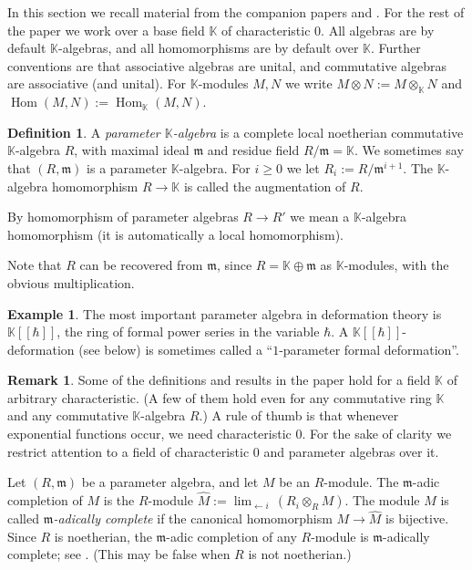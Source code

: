 \documentclass[a4paper, 10pt]{amsart}
\theoremstyle{definition}
\newtheorem{dfn}[equation]{Definition}
\newtheorem{rem}[equation]{Remark}
\newtheorem{exa}[equation]{Example}
\numberwithin{equation}{section}
\newcommand{\opn}{\operatorname}
\newcommand{\mfrak}[1]{\mathfrak{#1}}
\newcommand{\mbb}[1]{\mathbb{#1}}
\newcommand{\ot}{\otimes}
\newcommand{\what}[1]{\widehat{#1}}
\newcommand{\K}{\mbb{K}}
\newcommand{\m}{\mfrak{m}}
\begin{document}
In this section we recall material from the companion papers
\cite{Ye7} and \cite{Ye9}.
For the rest of the paper we work over a base field $\K$ of characteristic
$0$. All algebras are by default $\K$-algebras, and all homomorphisms are by
default over $\K$. Further conventions are that associative algebras are
unital, and commutative algebras are associative (and unital). 
For $\K$-modules $M, N$ we write $M \ot N := M \ot_{\K} N$  and
$\opn{Hom}(M, N) := \opn{Hom}_{\K}(M, N)$.

\begin{dfn} \label{dfn:13}
A {\em parameter $\K$-algebra} is a 
complete local noetherian commutative
$\K$-algebra $R$, with maximal ideal $\m$ and residue field 
$R / \m = \K$.
We sometimes say that $(R, \m)$ is a parameter $\K$-algebra.
For $i \geq 0$ we let
$R_i := R / \m^{i+1}$.
The $\K$-algebra homomorphism $R \to \K$ is called the 
augmentation of $R$.

By homomorphism of parameter algebras $R \to R'$ we mean a $\K$-algebra
homomorphism (it is automatically a local homomorphism).
\end{dfn}

Note that $R$ can be recovered from $\m$, since
$R = \K \oplus \m$ as $\K$-modules, with the obvious multiplication. 

\begin{exa}
The most important parameter algebra in deformation theory is
$\K[[\hbar]]$, the ring of formal power series in the variable
$\hbar$. A $\K[[\hbar]]$-deformation (see below) is sometimes called
a ``$1$-parameter formal deformation''. 
\end{exa}

\begin{rem}
Some of the definitions and results in the paper hold for a field $\K$ of
arbitrary characteristic.
(A few of them hold even for any commutative ring $\K$ and any 
commutative $\K$-algebra $R$.) A rule of thumb is that
whenever exponential functions occur, we need characteristic $0$. For the sake
of clarity we restrict attention to a field of characteristic $0$ and parameter
algebras over it.
\end{rem}

Let $(R, \m)$ be a parameter algebra, and let $M$ be an $R$-module. 
The $\m$-adic completion of $M$ is the $R$-module
$\what{M} :=  \lim_{\leftarrow i}\, (R_i \otimes_R M)$. 
The module $M$ is called {\em $\m$-adically complete} if the
canonical homomorphism
$M \to \what{M}$ is bijective. 
Since $R$ is noetherian, the $\m$-adic completion of any $R$-module is 
$\m$-adically complete; see \cite[Corollary 3.5]{Ye5}. (This may be false when
$R$ is not noetherian.) 
\end{document}
